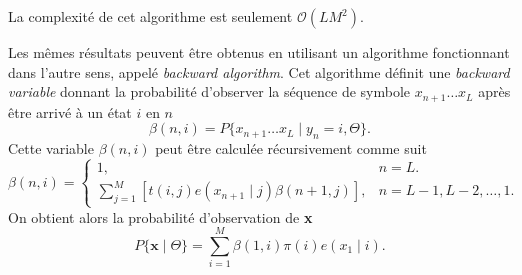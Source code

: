 \documentclass[a4paper, 11pt]{article}
\newcommand{\pinit}{\pi (i)}
\begin{document}
La complexité de cet algorithme est seulement $\mathcal{O}(LM^2)$.
\\
\par
Les mêmes résultats peuvent être obtenus en utilisant un algorithme fonctionnant dans l'autre sens, appelé \textit{backward algorithm}. Cet algorithme définit une \textit{backward variable} donnant la probabilité d'observer la séquence de symbole $x_{n+1}\dotsc x_L$ après être arrivé à un état $i$ en $n$
\begin{equation}
\beta (n,i)=P\{x_{n+1}\dotsc x_L\mid y_n=i,\Theta\}.
\end{equation}
Cette variable $\beta (n,i)$ peut être calculée récursivement comme suit
\begin{equation}
\beta (n,i) = \begin{cases}
	1, & n=L.\\
	\sum_{j=1}^{M}[t(i,j)e(x_{n+1}\mid j)\beta(n+1,j)], & n=L-1,L-2,\dotsc ,1.
\end{cases}
\end{equation}
On obtient alors la probabilité d'observation de \textbf{x} 
\begin{equation}
P\{\textbf{x}\mid\Theta\} = \sum_{i=1}^{M}\beta (1,i)\pinit e(x_1 \mid i).
\end{equation}
\end{document}
